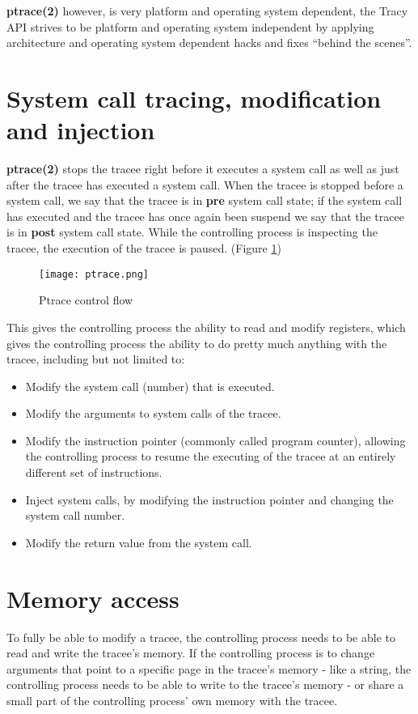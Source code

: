 \documentclass[a4paper, twoside, 10pt, twocolumn]{report}
\begin{document}
\textbf{ptrace(2)} however, is very platform and operating system dependent,
the Tracy API strives to be platform and operating system independent by
applying architecture and operating system dependent hacks and fixes
``behind the scenes''.

\section{System call tracing, modification and injection}

\textbf{ptrace(2)} stops the tracee right before it executes a system call as
well as just after the tracee has executed a system call. When the tracee
is stopped before a system call, we say that the tracee is in \textbf{pre}
system call state; if the system call has executed and the tracee has once again
been suspend we say that the tracee is in \textbf{post} system call state.
While the controlling process is inspecting the tracee, the execution of the
tracee is paused. (Figure \ref{fig1})


\begin{figure}
\label{fig1}
\texttt{[image: ptrace.png]}
\caption{Ptrace control flow}
\end{figure}

This gives the controlling process the ability to read and modify registers,
which gives the controlling process the ability to do pretty much anything
with the tracee, including but not limited to:

\begin{itemize}
\item Modify the system call (number) that is executed.
\item Modify the arguments to system calls of the tracee.
\item Modify the instruction pointer (commonly called program counter), allowing
    the controlling process to resume the executing of the tracee at an entirely
    different set of instructions.
\item Inject system calls, by modifying the instruction pointer and changing the
    system call number.
\item Modify the return value from the system call.
\end{itemize}

\section{Memory access}

To fully be able to modify a tracee, the controlling process needs to be able to
read and write the tracee's memory. If the controlling process is to change
arguments that point to a specific page in the tracee's memory - like a string,
the controlling process needs to be able to write to the tracee's memory - or
share a small part of the controlling process' own memory with the tracee.
\end{document}
